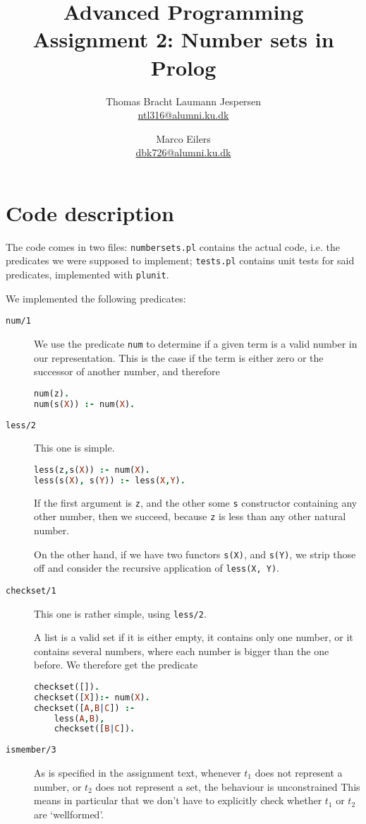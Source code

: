 \documentclass[a4paper]{article}
\title{Advanced Programming\\ Assignment 2: Number sets in Prolog}
\author{Thomas Bracht Laumann Jespersen\\ \url{ntl316@alumni.ku.dk} \and Marco Eilers\\ \url{dbk726@alumni.ku.dk} }
\newcommand{\pfuncn}[2]{\textnormal{\texttt{#1/#2}}\xspace}
\begin{document}
\maketitle
\section*{Code description}
The code comes in two files: \texttt{numbersets.pl} contains the actual code, i.e. the predicates we were supposed to implement; \texttt{tests.pl} contains unit tests for said predicates, implemented with \texttt{plunit}.

We implemented the following predicates:

\begin{description}
\item[\pfuncn{num}{1}] We use the predicate \texttt{num} to determine if a given term is a valid number in our representation. This is the case if the term is either zero or the successor of another number, and therefore
\begin{lstlisting}[language=prolog]
num(z).
num(s(X)) :- num(X).
\end{lstlisting}
\item[\pfuncn{less}{2}] This one is simple.
\begin{lstlisting}[language=prolog]
less(z,s(X)) :- num(X).
less(s(X), s(Y)) :- less(X,Y).
\end{lstlisting}
If the first argument is \texttt{z}, and the other some \texttt{s} constructor containing any other number, then we succeed, because \texttt{z} is less than any other natural number.

On the other hand, if we have two functors \texttt{s(X)}, and \texttt{s(Y)}, we strip those off and consider the recursive application of \texttt{less(X, Y)}.
\item[\pfuncn{checkset}{1}] This one is rather simple, using \pfuncn{less}{2}.

A list is a valid set if it is either empty, it contains only one number, or it contains several numbers, where each number is bigger than the one before.  We therefore get the predicate 
\begin{lstlisting}[language=prolog]
checkset([]).
checkset([X]):- num(X).
checkset([A,B|C]) :- 
	less(A,B), 
	checkset([B|C]).
\end{lstlisting}
\item[\pfuncn{ismember}{3}] As is specified in the assignment text, whenever $t_1$ does not represent a number, or $t_2$ does not represent a set, the behaviour is unconstrained %
  This means in particular that we don't have to explicitly check whether $t_1$ or $t_2$ are `wellformed'.


\end{description}
\end{document}
